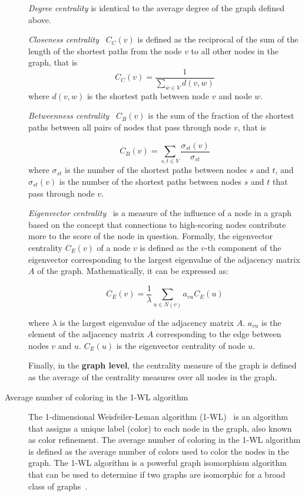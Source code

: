 \begin{description}
    \textit{Degree centrality} is identical to the average degree of the graph defined above. 
    
    \textit{Closeness centrality}~\cite{bavelas1950communication} $C_C(v)$ is defined as the reciprocal of the sum of the length of the shortest paths from the node $v$ to all other nodes in the graph, that is 
    $$C_C(v) = \frac{1}{\sum_{w\in V}{d(v ,w)}}$$
    where $d(v, w)$ is the shortest path between node $v$ and node $w$. 
    
    \textit{Betweenness centrality}~\cite{freeman1977set} $C_B(v)$ is the sum of the fraction of the shortest paths between all pairs of nodes that pass through node $v$, that is
    
    $$
        C_B(v) = \sum_{s,t \in V} \frac{\sigma_{st}(v)}{\sigma_{st}}
    $$
    where $\sigma_{st}$ is the number of the shortest paths between nodes $s$ and $t$, and $\sigma_{st}(v)$ is the number of the shortest paths between nodes $s$ and $t$ that pass through node $v$.
    
    \textit{Eigenvector centrality}~\cite{bonacich1972factoring}\cite{bonacich2007some} is a measure of the influence of a node in a graph based on the concept that connections to high-scoring nodes contribute more to the score of the node in question. Formally, the eigenvector centrality $C_E(v)$ of a node $v$  is defined as the $v$-th component of the eigenvector corresponding to the largest eigenvalue of the adjacency matrix $A$ of the graph. Mathematically, it can be expressed as:
    
    \[ C_E(v) = \frac{1}{\lambda} \sum_{u \in N(v)} a_{vu} C_E(u) \]
    
    where $ \lambda$ is the largest eigenvalue of the adjacency matrix $A$.
$a_{vu}$ is the element of the adjacency matrix $A$ corresponding to the edge between nodes $v$  and $u$.
$ C_E(u)$  is the eigenvector centrality of node $u$.


    Finally, in the \textbf{graph level}, the centrality measure of the graph is defined as the average of the centrality measures over all nodes in the graph.

    \item [Average number of coloring in the 1-WL algorithm] 
    \sloppy
    The 1-dimensional Weisfeiler-Leman algorithm (1-WL)~\cite{weisfeiler1968reduction} is an algorithm that assigns a unique label (color) to each node in the graph, also known as color refinement. The average number of coloring in the 1-WL algorithm is defined as the average number of colors used to color the nodes in the graph. The 1-WL algorithm is a powerful graph isomorphism algorithm that can be used to determine if two graphs are isomorphic for a broad class of graphs~\cite{babai1979canonical}.  
\end{description}